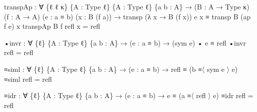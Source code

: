 \documentclass[
  11pt,
  oneside,
  article]{memoir}
\newenvironment{Shaded}{}{}
\newcommand{\NormalTok}[1]{#1}
\newcommand{\OtherTok}[1]{\textcolor[rgb]{0.00,0.44,0.13}{#1}}
\theoremstyle{definition}
\theoremstyle{plain}
\newcommand{\0}{\textsf{0}}
\newcommand{\1}{\tn{\textsf{1}}}
\begin{document}
\begin{Shaded}
\begin{Highlighting}[]
\NormalTok{transpAp }\OtherTok{:} \OtherTok{∀} \OtherTok{\{}\NormalTok{ℓ ℓ\textquotesingle{} κ}\OtherTok{\}} \OtherTok{\{}\NormalTok{A }\OtherTok{:}\NormalTok{ Type ℓ}\OtherTok{\}} \OtherTok{\{}\NormalTok{A\textquotesingle{} }\OtherTok{:}\NormalTok{ Type ℓ\textquotesingle{}}\OtherTok{\}} \OtherTok{\{}\NormalTok{a b }\OtherTok{:}\NormalTok{ A}\OtherTok{\}}
           \OtherTok{→} \OtherTok{(}\NormalTok{B }\OtherTok{:}\NormalTok{ A\textquotesingle{} }\OtherTok{→}\NormalTok{ Type κ}\OtherTok{)} \OtherTok{(}\NormalTok{f }\OtherTok{:}\NormalTok{ A }\OtherTok{→}\NormalTok{ A\textquotesingle{}}\OtherTok{)} \OtherTok{(}\NormalTok{e }\OtherTok{:}\NormalTok{ a ≡ b}\OtherTok{)} \OtherTok{(}\NormalTok{x }\OtherTok{:}\NormalTok{ B }\OtherTok{(}\NormalTok{f a}\OtherTok{))}
           \OtherTok{→}\NormalTok{ transp }\OtherTok{(λ}\NormalTok{ x }\OtherTok{→}\NormalTok{ B }\OtherTok{(}\NormalTok{f x}\OtherTok{))}\NormalTok{ e x ≡ transp B }\OtherTok{(}\NormalTok{ap f e}\OtherTok{)}\NormalTok{ x}
\NormalTok{transpAp B f refl x }\OtherTok{=}\NormalTok{ refl}

\NormalTok{•invr }\OtherTok{:} \OtherTok{∀} \OtherTok{\{}\NormalTok{ℓ}\OtherTok{\}} \OtherTok{\{}\NormalTok{A }\OtherTok{:}\NormalTok{ Type ℓ}\OtherTok{\}} \OtherTok{\{}\NormalTok{a b }\OtherTok{:}\NormalTok{ A}\OtherTok{\}}
        \OtherTok{→} \OtherTok{(}\NormalTok{e }\OtherTok{:}\NormalTok{ a ≡ b}\OtherTok{)} \OtherTok{→} \OtherTok{(}\NormalTok{sym e}\OtherTok{)}\NormalTok{ • e ≡ refl}
\NormalTok{•invr refl }\OtherTok{=}\NormalTok{ refl}

\NormalTok{≡siml }\OtherTok{:} \OtherTok{∀} \OtherTok{\{}\NormalTok{ℓ}\OtherTok{\}} \OtherTok{\{}\NormalTok{A }\OtherTok{:}\NormalTok{ Type ℓ}\OtherTok{\}} \OtherTok{\{}\NormalTok{a b }\OtherTok{:}\NormalTok{ A}\OtherTok{\}}
        \OtherTok{→} \OtherTok{(}\NormalTok{e }\OtherTok{:}\NormalTok{ a ≡ b}\OtherTok{)} \OtherTok{→}\NormalTok{ refl ≡ }\OtherTok{(}\NormalTok{b ≡〈 sym e 〉 e}\OtherTok{)}
\NormalTok{≡siml refl }\OtherTok{=}\NormalTok{ refl}

\NormalTok{≡idr }\OtherTok{:} \OtherTok{∀} \OtherTok{\{}\NormalTok{ℓ}\OtherTok{\}} \OtherTok{\{}\NormalTok{A }\OtherTok{:}\NormalTok{ Type ℓ}\OtherTok{\}} \OtherTok{\{}\NormalTok{a b }\OtherTok{:}\NormalTok{ A}\OtherTok{\}}
       \OtherTok{→} \OtherTok{(}\NormalTok{e }\OtherTok{:}\NormalTok{ a ≡ b}\OtherTok{)} \OtherTok{→}\NormalTok{ e ≡ }\OtherTok{(}\NormalTok{a ≡〈 refl 〉 e}\OtherTok{)}
\NormalTok{≡idr refl }\OtherTok{=}\NormalTok{ refl}


\end{Highlighting}
\end{Shaded}
\end{document}
